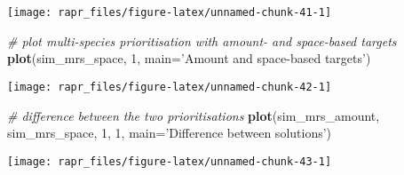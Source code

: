 \documentclass[11pt,]{article}
\newenvironment{Shaded}{\begin{snugshade}}{\end{snugshade}}
\newcommand{\KeywordTok}[1]{\textcolor[rgb]{0.13,0.29,0.53}{\textbf{{#1}}}}
\newcommand{\DataTypeTok}[1]{\textcolor[rgb]{0.13,0.29,0.53}{{#1}}}
\newcommand{\DecValTok}[1]{\textcolor[rgb]{0.00,0.00,0.81}{{#1}}}
\newcommand{\StringTok}[1]{\textcolor[rgb]{0.31,0.60,0.02}{{#1}}}
\newcommand{\CommentTok}[1]{\textcolor[rgb]{0.56,0.35,0.01}{\textit{{#1}}}}
\newcommand{\NormalTok}[1]{{#1}}
\let\origfigure\figure
\let\endorigfigure\endfigure
\renewenvironment{figure}[1][2] {
	\expandafter\origfigure\expandafter[H]
} {
	\endorigfigure
}
\begin{document}
\begin{figure}

{\centering \texttt{[image: rapr\_files/figure-latex/unnamed-chunk-41-1]} 

}

\caption{A multi-species prioritisation for the uniformly, normally, and bimodally distributed species generated using just amount-based targets (20\%). Squares represent planning units. Dark green planning units are selected for preservation.}\label{fig:unnamed-chunk-41}
\end{figure}

\begin{Shaded}
\begin{Highlighting}[]
\CommentTok{# plot multi-species prioritisation with amount- and space-based targets}
\KeywordTok{plot}\NormalTok{(sim_mrs_space, }\DecValTok{1}\NormalTok{, }\DataTypeTok{main=}\StringTok{'Amount and space-based targets'}\NormalTok{)}
\end{Highlighting}
\end{Shaded}

\begin{figure}

{\centering \texttt{[image: rapr\_files/figure-latex/unnamed-chunk-42-1]} 

}

\caption{A multi-species prioritisation for the uniformly, normally, and bimodally distributed species generated using amount-based targets (20\%) and space-based targets (85\%). See Figure 12 caption for conventions.}\label{fig:unnamed-chunk-42}
\end{figure}

\begin{Shaded}
\begin{Highlighting}[]
\CommentTok{# difference between the two prioritisations}
\KeywordTok{plot}\NormalTok{(sim_mrs_amount, sim_mrs_space, }\DecValTok{1}\NormalTok{, }\DecValTok{1}\NormalTok{, }\DataTypeTok{main=}\StringTok{'Difference between solutions'}\NormalTok{)}
\end{Highlighting}
\end{Shaded}

\begin{figure}

{\centering \texttt{[image: rapr\_files/figure-latex/unnamed-chunk-43-1]} 

}

\caption{Difference between two multi-species prioritisations. See Figure 7 caption for conventions.}\label{fig:unnamed-chunk-43}
\end{figure}
\end{document}

